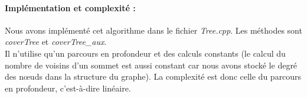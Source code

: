     \paragraph{Implémentation et complexité :\\}

    \indent Nous avons implémenté cet algorithme dans le fichier
    \emph{Tree.cpp}. Les méthodes sont \emph{coverTree} et
    \emph{coverTree\_aux}.\\
    Il n'utilise qu'un parcours en profondeur et des calculs constants
    (le calcul du nombre de voisins d'un sommet est aussi constant car
    nous avons stocké le degré des n\oe{}uds dans la structure du
    graphe). La complexité est donc celle du parcours en profondeur,
    c'est-à-dire linéaire.